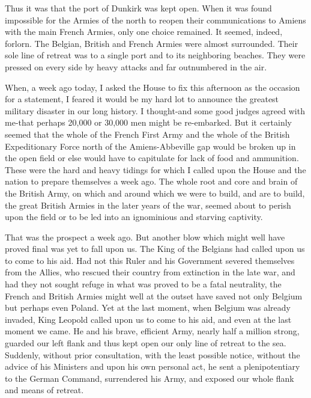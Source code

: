 \documentclass[a4paper]{amsbook}
\begin{document}
Thus it was that the port of Dunkirk was kept open. When it was found impossible for the Armies of the north to reopen their communications to Amiens with the main French Armies, only one choice remained. It seemed, indeed, forlorn. The Belgian, British and French Armies were almost surrounded. Their sole line of retreat was to a single port and to its neighboring beaches. They were pressed on every side by heavy attacks and far outnumbered in the air.

When, a week ago today, I asked the House to fix this afternoon as the occasion for a statement, I feared it would be my hard lot to announce the greatest military disaster in our long history. I thought-and some good judges agreed with me-that perhaps 20,000 or 30,000 men might be re-embarked. But it certainly seemed that the whole of the French First Army and the whole of the British Expeditionary Force north of the Amiens-Abbeville gap would be broken up in the open field or else would have to capitulate for lack of food and ammunition. These were the hard and heavy tidings for which I called upon the House and the nation to prepare themselves a week ago. The whole root and core and brain of the British Army, on which and around which we were to build, and are to build, the great British Armies in the later years of the war, seemed about to perish upon the field or to be led into an ignominious and starving captivity.

That was the prospect a week ago. But another blow which might well have proved final was yet to fall upon us. The King of the Belgians had called upon us to come to his aid. Had not this Ruler and his Government severed themselves from the Allies, who rescued their country from extinction in the late war, and had they not sought refuge in what was proved to be a fatal neutrality, the French and British Armies might well at the outset have saved not only Belgium but perhaps even Poland. Yet at the last moment, when Belgium was already invaded, King Leopold called upon us to come to his aid, and even at the last moment we came. He and his brave, efficient Army, nearly half a million strong, guarded our left flank and thus kept open our only line of retreat to the sea. Suddenly, without prior consultation, with the least possible notice, without the advice of his Ministers and upon his own personal act, he sent a plenipotentiary to the German Command, surrendered his Army, and exposed our whole flank and means of retreat.
\end{document}
